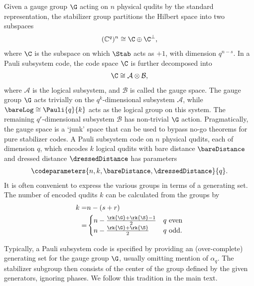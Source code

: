 \begin{definition}
	Given a gauge group $\G$ acting on $n$ physical qudits by the standard representation, the stabilizer group partitions the Hilbert space into two subspaces
	\begin{align}
		(\mathbb{C}^q)^n\cong \C\oplus\C^{\perp},
	\end{align}
	where $\C$ is the subspace on which $\Stab$ acts as $+1$, with dimension $q^{n-s}$.
	In a Pauli subsystem code, the code space $\C$ is further decomposed into
	\begin{align}
		\C\cong \mathcal{A}\otimes\mathcal{B},
	\end{align}
	where $\mathcal{A}$ is the logical subsystem, and $\mathcal{B}$ is called the gauge space.
	The gauge group $\G$ acts trivially on the $q^k$-dimensional subsystem $\mathcal{A}$, while $\bareLog\cong\Pauli{q}{k}$ acts as the logical group on this system.
	The remaining $q^r$-dimensional subsystem $\mathcal{B}$ has non-trivial $\G$ action.
	Pragmatically, the gauge space is a `junk' space that can be used to bypass no-go theorems for pure stabilizer codes.
	A Pauli subsystem code on $n$ physical qudits, each of dimension $q$, which encodes $k$ logical qudits with bare distance $\bareDistance$ and dressed distance $\dressedDistance$ has parameters
	\begin{align}
		\codeparameters{n,k,\bareDistance,\dressedDistance}{q}.
	\end{align}
	It is often convenient to express the various groups in terms of a generating set.
	The number of encoded qudits $k$ can be calculated from the groups by
	\begin{align}
		k = & n-(s+r) \\
		=   &
		\begin{cases}
			n-\frac{\rk{\G}+\rk{\S}-1}{2} & \text{$q$ even} \\
			n-\frac{\rk{\G}+\rk{\S}}{2}   & \text{$q$ odd}.
		\end{cases}
	\end{align}

	Typically, a Pauli subsystem code is specified by providing an (over-complete) generating set for the gauge group $\G$, usually omitting mention of $\alpha_{q}$.
	The stabilizer subgroup then consists of the center of the group defined by the given generators, ignoring phases.
	We follow this tradition in the main text.
\end{definition}